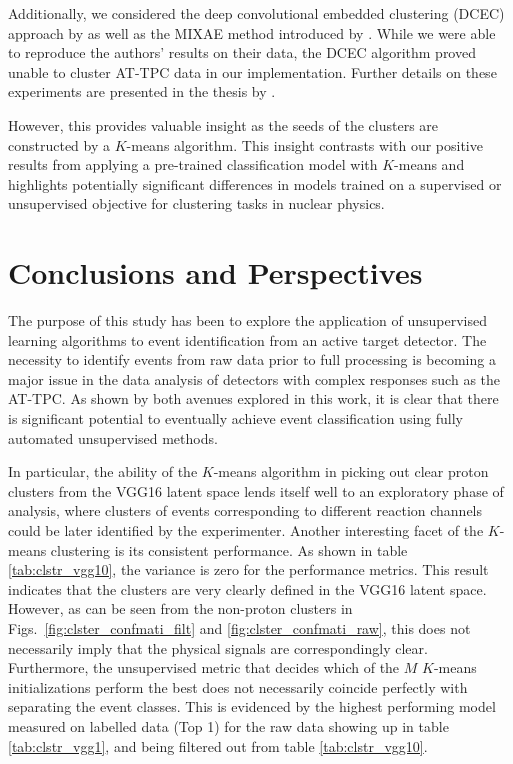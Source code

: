 \documentclass[review,sort&compress]{elsarticle}
\begin{document}
Additionally, we considered the deep convolutional embedded clustering (DCEC) approach by \citet{Guo2017} as well as the MIXAE method introduced by \citet{Zhang}. While we were able to reproduce the authors' results on their data, the DCEC algorithm proved unable to cluster AT-TPC data in our implementation. Further details on these experiments are presented in the thesis by \citet{SolliThesis}.

However, this provides valuable insight as the seeds of the clusters are constructed by a $K$-means algorithm. This insight contrasts with our positive results from applying a pre-trained classification model with $K$-means and highlights potentially significant differences in models trained on a supervised or unsupervised objective for clustering tasks in nuclear physics. 

\section{Conclusions and Perspectives}\label{sec:conclusion}
The purpose of this study has been to explore the application of unsupervised learning algorithms to event identification from an active target detector. The necessity to identify events from raw data prior to full processing is becoming a major issue in the data analysis of detectors with complex responses such as the AT-TPC.
As shown by both avenues explored in this work, it is clear that there is significant potential to eventually achieve event classification using fully automated unsupervised methods.

In particular, the ability of the $K$-means algorithm in picking out clear proton clusters from the VGG16 latent space lends itself well to an exploratory phase of analysis, where clusters of events corresponding to different reaction channels could be later identified by the experimenter.
Another interesting facet of the $K$-means clustering is its consistent performance. As shown in table \ref{tab:clstr_vgg10}, the variance is zero for the performance metrics. This result indicates that the clusters are very clearly defined in the VGG16 latent space. However, as can be seen from the non-proton clusters in Figs.~\ref{fig:clster_confmati_filt} and \ref{fig:clster_confmati_raw},  this does not necessarily imply that the physical signals are correspondingly clear.  Furthermore, the unsupervised metric that decides which of the $M$ $K$-means initializations perform the best does not necessarily coincide perfectly with separating the event classes. This is evidenced by the highest performing model measured on labelled data (Top 1) for the raw data showing up in table \ref{tab:clstr_vgg1}, and being filtered out from table \ref{tab:clstr_vgg10}.
\end{document}
